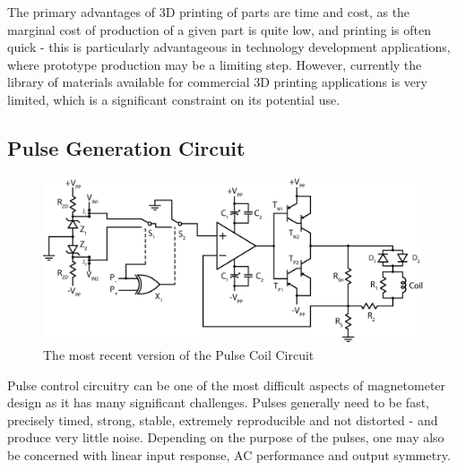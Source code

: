 \documentclass[PaulGanssle-Thesis.tex]{subfiles}
\begin{document}
The primary advantages of 3D printing of parts are time and cost, as the marginal cost of production of a given part is quite low, and printing is often quick - this is particularly advantageous in technology development applications, where prototype production may be a limiting step. However, currently the library of materials available for commercial 3D printing applications is very limited, which is a significant constraint on its potential use. 

\subsection{Pulse Generation Circuit}
\label{pulse.circuit}
\begin{figure}[h!]
\includegraphics[width=0.95\tw]{figures/magnetometer/PulseCircuitFinal.eps}
\caption{The most recent version of the Pulse Coil Circuit}
\label{fig:PulseCoilCircuitFinal}
\end{figure}

Pulse control circuitry can be one of the most difficult aspects of magnetometer design as it has many significant challenges. Pulses generally need to be fast, precisely timed, strong, stable, extremely reproducible and not distorted - and produce very little noise. Depending on the purpose of the pulses, one may also be concerned with linear input response, AC performance and output symmetry.
\end{document}
